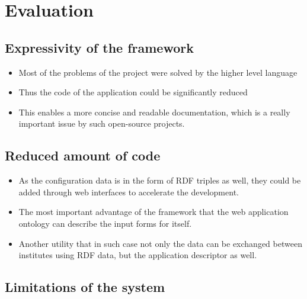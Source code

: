

\chapter{Evaluation}

\section{Expressivity of the framework}

\begin{itemize}
	\item Most of the problems of the project were solved by the higher level language 
	\item Thus the code of the application could be significantly reduced
	\item This enables a more concise and readable documentation, which is a really important issue by such open-source projects.
\end{itemize}


\section{Reduced amount of code}

\begin{itemize}
	\item As the configuration data is in the form of RDF triples as well, they could be added through web interfaces to accelerate the development.
	\item The most important advantage of the framework that the web application ontology can describe the input forms for itself. 
	\item Another utility that in such case not only the data can be exchanged between institutes using RDF data, but the application descriptor as well.
\end{itemize}

\section{Limitations of the system}




